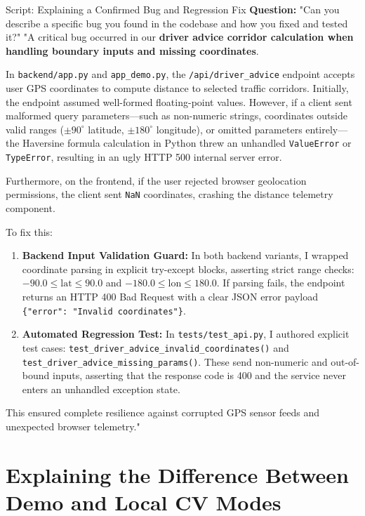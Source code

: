 \begin{interviewq}{Script: Explaining a Confirmed Bug and Regression Fix}
\textbf{Question:} "Can you describe a specific bug you found in the codebase and how you fixed and tested it?"
\tcblower
"A critical bug occurred in our \textbf{driver advice corridor calculation when handling boundary inputs and missing coordinates}.

In \texttt{backend/app.py} and \texttt{app\_demo.py}, the \texttt{/api/driver\_advice} endpoint accepts user GPS coordinates to compute distance to selected traffic corridors. Initially, the endpoint assumed well-formed floating-point values. However, if a client sent malformed query parameters---such as non-numeric strings, coordinates outside valid ranges ($\pm 90^\circ$ latitude, $\pm 180^\circ$ longitude), or omitted parameters entirely---the Haversine formula calculation in Python threw an unhandled \texttt{ValueError} or \texttt{TypeError}, resulting in an ugly HTTP 500 internal server error.

Furthermore, on the frontend, if the user rejected browser geolocation permissions, the client sent \texttt{NaN} coordinates, crashing the distance telemetry component.

To fix this:
\begin{enumerate}
    \item \textbf{Backend Input Validation Guard:} In both backend variants, I wrapped coordinate parsing in explicit try-except blocks, asserting strict range checks: $-90.0 \le \text{lat} \le 90.0$ and $-180.0 \le \text{lon} \le 180.0$. If parsing fails, the endpoint returns an HTTP 400 Bad Request with a clear JSON error payload \texttt{\{"error": "Invalid coordinates"\}}.
    \item \textbf{Automated Regression Test:} In \texttt{tests/test\_api.py}, I authored explicit test cases: \texttt{test\_driver\_advice\_invalid\_coordinates()} and \texttt{test\_driver\_advice\_missing\_params()}. These send non-numeric and out-of-bound inputs, asserting that the response code is 400 and the service never enters an unhandled exception state.
\end{enumerate}
This ensured complete resilience against corrupted GPS sensor feeds and unexpected browser telemetry."
\end{interviewq}

\section{Explaining the Difference Between Demo and Local CV Modes}
\label{sec:script_modes_diff}

